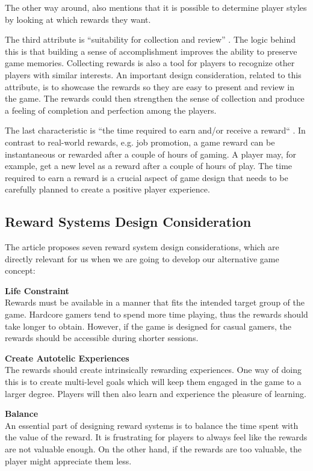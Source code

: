 \documentclass[../Main.tex]{subfiles}
\begin{document}
The other way around, \citeauthor{wang_game_2011} also mentions that it is possible to determine player styles by looking at which rewards they want.

The third attribute is “suitability for collection and review” \cite{wang_game_2011}. The logic behind this is that building a sense of accomplishment improves the ability to preserve game memories. Collecting rewards is also a tool for players to recognize other players with similar interests. An important design consideration, related to this attribute, is to showcase the rewards so they are easy to present and review in the game. The rewards could then strengthen the sense of collection and produce a feeling of completion and perfection among the players.

The last characteristic is “the time required to earn and/or receive a reward“ \cite{wang_game_2011}. In contrast to real-world rewards, e.g. job promotion, a game reward can be instantaneous or rewarded after a couple of hours of gaming. A player may, for example, get a new level as a reward after a couple of hours of play. The time required to earn a reward is a crucial aspect of game design that needs to be carefully planned to create a positive player experience.

\subsection{Reward Systems Design Consideration}
The article proposes seven reward system design considerations, which are directly relevant for us when we are going to develop our alternative game concept:

\textbf{Life Constraint}\\
Rewards must be available in a manner that fits the intended target group of the game. Hardcore gamers tend to spend more time playing, thus the rewards should take longer to obtain. However, if the game is designed for casual gamers, the rewards should be accessible during shorter sessions.

\textbf{Create Autotelic Experiences}\\
The rewards should create intrinsically rewarding experiences. One way of doing this is to create multi-level goals which will keep them engaged in the game to a larger degree. Players will then also learn and experience the pleasure of learning. 

\textbf{Balance}\\
An essential part of designing reward systems is to balance the time spent with the value of the reward. It is frustrating for players to always feel like the rewards are not valuable enough. On the other hand, if the rewards are too valuable, the player might appreciate them less.
\end{document}
